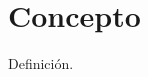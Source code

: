 \documentclass[apuntes]{uc3mmaster}
\begin{document}
\makeportada
\section{Concepto}
\begin{definicion}[Término] Definición. \end{definicion}
\end{document}
